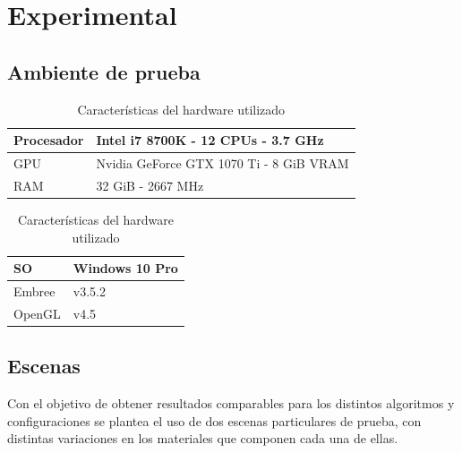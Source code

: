 \chapter{Experimental}
\label{ch:chap05}

\section{Ambiente de prueba}
\label{sec:hardware}

\begin{table}[H]
	\centering
	\begin{tabular}{l|l}
		Procesador & Intel i7 8700K - 12 CPUs - 3.7 GHz       \\
		\hline
		GPU        & Nvidia GeForce GTX 1070 Ti - 8 GiB  VRAM \\
		\hline
		RAM        & 32 GiB - 2667 MHz                        \\
		\hline
	\end{tabular}
	\caption{Características del hardware utilizado}
\end{table}

\begin{table}[H]
	\centering
	\begin{tabular}{l|l}
	SO & Windows 10 Pro        \\
		\hline
	Embree        & v3.5.2 \\
		\hline
		OpenGL        & v4.5  \\
		\hline
	\end{tabular}
	\caption{Características del hardware utilizado}
\end{table}

\section{Escenas}
\label{sec:escenas}

Con el objetivo de obtener resultados comparables para los distintos algoritmos y configuraciones se plantea el uso de dos escenas particulares de prueba, con distintas variaciones en los materiales que componen cada una de ellas.


